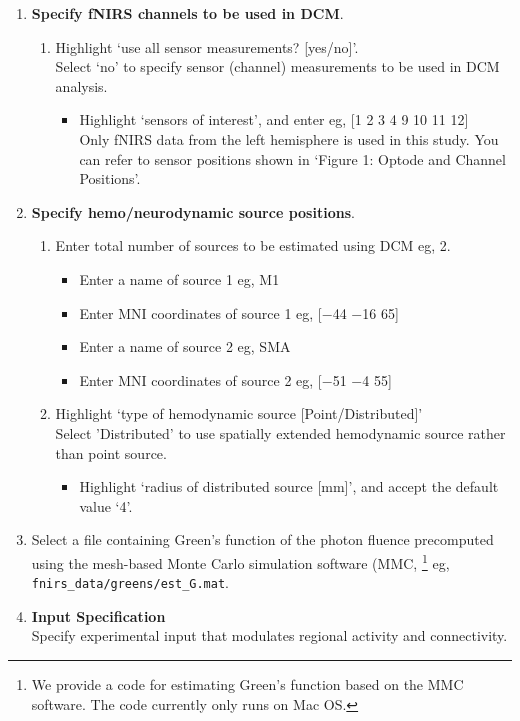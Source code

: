 \begin{enumerate}
\item \textbf{Specify fNIRS channels to be used in DCM}.
\begin{enumerate}
\item Highlight `use all sensor measurements? [yes/no]'.\\Select `no' to specify sensor (channel) measurements to be used in DCM analysis. 
\begin{itemize}
\item Highlight `sensors of interest', and enter eg, [1 2 3 4 9 10 11 12] \\Only fNIRS data from the left hemisphere is used in this study. You can refer to sensor positions shown in `Figure 1: Optode and Channel Positions'.
\end{itemize}
\end{enumerate}
\item \textbf{Specify hemo/neurodynamic source positions}.
\begin{enumerate}
\item Enter total number of sources to be estimated using DCM eg, 2. 
\begin{itemize}
\item Enter a name of source 1 eg, M1
\item Enter MNI coordinates of source 1 eg, [$-$44 $-$16 65]
\item Enter a name of source 2 eg, SMA
\item Enter MNI coordinates of source 2 eg, [$-$51 $-$4 55]
\end{itemize}
\item Highlight `type of hemodynamic source [Point/Distributed]' \\Select 'Distributed' to use spatially extended hemodynamic source rather than point source. 
\begin{itemize}
\item Highlight `radius of distributed source [mm]', and accept the default value `4'. 
\end{itemize}
\end{enumerate}
\item Select a file containing Green's function of the photon fluence precomputed using the mesh-based Monte Carlo simulation software (MMC, \cite{fang2010mesh}\footnote{We provide a code for estimating Green's function based on the MMC software. The code currently only runs on Mac OS.} eg, \texttt{fnirs\_data/greens/est\_G.mat}.
\item \textbf{Input Specification}
\\Specify experimental input that modulates regional activity and connectivity. 

\end{enumerate}
